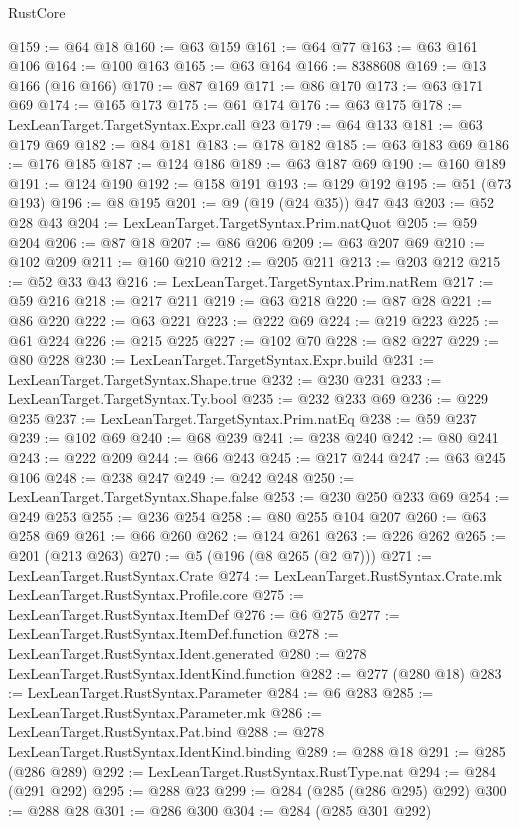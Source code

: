\begin{lexlean}{RustCore}
\begin{coremodule}
@159 := @64 @18
@160 := @63 @159
@161 := @64 @77
@163 := @63 @161 @106
@164 := @100 @163
@165 := @63 @164
@166 := 8388608
@169 := @13 @166 (@16 @166)
@170 := @87 @169
@171 := @86 @170
@173 := @63 @171 @69
@174 := @165 @173
@175 := @61 @174
@176 := @63 @175
@178 := LexLeanTarget.TargetSyntax.Expr.call @23
@179 := @64 @133
@181 := @63 @179 @69
@182 := @84 @181
@183 := @178 @182
@185 := @63 @183 @69
@186 := @176 @185
@187 := @124 @186
@189 := @63 @187 @69
@190 := @160 @189
@191 := @124 @190
@192 := @158 @191
@193 := @129 @192
@195 := @51 (@73 @193)
@196 := @8 @195
@201 := @9 (@19 (@24 @35)) @47 @43
@203 := @52 @28 @43
@204 := LexLeanTarget.TargetSyntax.Prim.natQuot
@205 := @59 @204
@206 := @87 @18
@207 := @86 @206
@209 := @63 @207 @69
@210 := @102 @209
@211 := @160 @210
@212 := @205 @211
@213 := @203 @212
@215 := @52 @33 @43
@216 := LexLeanTarget.TargetSyntax.Prim.natRem
@217 := @59 @216
@218 := @217 @211
@219 := @63 @218
@220 := @87 @28
@221 := @86 @220
@222 := @63 @221
@223 := @222 @69
@224 := @219 @223
@225 := @61 @224
@226 := @215 @225
@227 := @102 @70
@228 := @82 @227
@229 := @80 @228
@230 := LexLeanTarget.TargetSyntax.Expr.build
@231 := LexLeanTarget.TargetSyntax.Shape.true
@232 := @230 @231
@233 := LexLeanTarget.TargetSyntax.Ty.bool
@235 := @232 @233 @69
@236 := @229 @235
@237 := LexLeanTarget.TargetSyntax.Prim.natEq
@238 := @59 @237
@239 := @102 @69
@240 := @68 @239
@241 := @238 @240
@242 := @80 @241
@243 := @222 @209
@244 := @66 @243
@245 := @217 @244
@247 := @63 @245 @106
@248 := @238 @247
@249 := @242 @248
@250 := LexLeanTarget.TargetSyntax.Shape.false
@253 := @230 @250 @233 @69
@254 := @249 @253
@255 := @236 @254
@258 := @80 @255 @104 @207
@260 := @63 @258 @69
@261 := @66 @260
@262 := @124 @261
@263 := @226 @262
@265 := @201 (@213 @263)
@270 := @5 (@196 (@8 @265 (@2 @7)))
@271 := LexLeanTarget.RustSyntax.Crate
@274 := LexLeanTarget.RustSyntax.Crate.mk LexLeanTarget.RustSyntax.Profile.core
@275 := LexLeanTarget.RustSyntax.ItemDef
@276 := @6 @275
@277 := LexLeanTarget.RustSyntax.ItemDef.function
@278 := LexLeanTarget.RustSyntax.Ident.generated
@280 := @278 LexLeanTarget.RustSyntax.IdentKind.function
@282 := @277 (@280 @18)
@283 := LexLeanTarget.RustSyntax.Parameter
@284 := @6 @283
@285 := LexLeanTarget.RustSyntax.Parameter.mk
@286 := LexLeanTarget.RustSyntax.Pat.bind
@288 := @278 LexLeanTarget.RustSyntax.IdentKind.binding
@289 := @288 @18
@291 := @285 (@286 @289)
@292 := LexLeanTarget.RustSyntax.RustType.nat
@294 := @284 (@291 @292)
@295 := @288 @23
@299 := @284 (@285 (@286 @295) @292)
@300 := @288 @28
@301 := @286 @300
@304 := @284 (@285 @301 @292)

\end{coremodule}
\end{lexlean}
